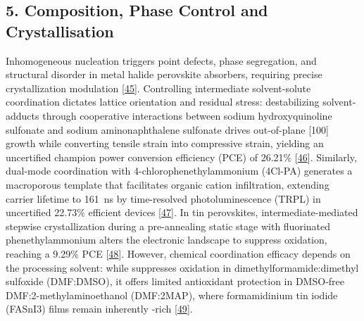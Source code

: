 \documentclass[
  11pt,
]{article}
\begin{document}
\subsection{5. Composition, Phase Control and
Crystallisation}\label{composition-phase-control-and-crystallisation}

Inhomogeneous nucleation triggers point defects, phase segregation, and
structural disorder in metal halide perovskite absorbers, requiring
precise crystallization modulation
{[}\href{https://doi.org/10.1002/adma.74388}{45}{]}. Controlling
intermediate solvent-solute coordination dictates lattice orientation
and residual stress: destabilizing solvent- adducts through
cooperative interactions between sodium hydroxyquinoline sulfonate and
sodium aminonaphthalene sulfonate drives out-of-plane {[}100{]} growth
while converting tensile strain into compressive strain, yielding an
uncertified champion power conversion efficiency (PCE) of 26.21\%
{[}\href{https://doi.org/10.1002/aenm.71474}{46}{]}. Similarly,
dual-mode coordination with 4-chlorophenethylammonium (4Cl-PA) generates
a macroporous  template that facilitates organic cation
infiltration, extending carrier lifetime to \qty{161}{\nano\second} by
time-resolved photoluminescence (TRPL) in uncertified 22.73\% efficient
devices {[}\href{https://doi.org/10.1016/j.jcis.2026.141449}{47}{]}. In
tin perovskites, intermediate-mediated stepwise crystallization during a
pre-annealing static stage with fluorinated phenethylammonium alters the
 electronic landscape to suppress  oxidation,
reaching a 9.29\% PCE
{[}\href{https://doi.org/10.1021/acsami.6c11057}{48}{]}. However,
chemical coordination efficacy depends on the processing solvent: while
 suppresses  oxidation in dimethylformamide:dimethyl
sulfoxide (DMF:DMSO), it offers limited antioxidant protection in
DMSO-free DMF:2-methylaminoethanol (DMF:2MAP), where formamidinium tin
iodide (FASnI3) films remain inherently -rich
{[}\href{https://doi.org/10.1021/acsaem.6c02063}{49}{]}.
\end{document}
